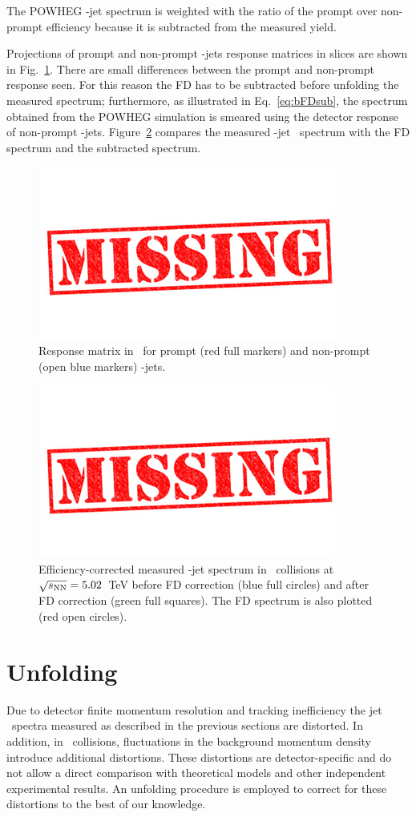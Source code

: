 The POWHEG \Dstar-jet spectrum is weighted with the ratio of the prompt over non-prompt efficiency because it is subtracted from the measured yield.

Projections of prompt and non-prompt \Dstar-jets response matrices in slices \ptchjetgen are shown in Fig.~\ref{fig:pPbres_prompt_nonprompt}. There are small differences between the prompt and non-prompt response seen. 
For this reason the FD has to be subtracted before unfolding the measured spectrum; furthermore, as illustrated in Eq.~\ref{eq:bFDsub}, the spectrum obtained
from the POWHEG simulation is smeared using the detector response of non-prompt \Dstar-jets. 
Figure~\ref{fig:pPbFD_corr} compares the measured \Dstar-jet \pt\ spectrum with the FD spectrum and the subtracted spectrum.

\begin{figure}[bth]
\centering
\includegraphics[width=.2\textwidth]{missing}
\caption{Response matrix in \ptchjetgen\ for prompt (red full markers) and non-prompt (open blue markers) \Dstar-jets.}
\label{fig:pPbres_prompt_nonprompt}
\end{figure}


\begin{figure}[bth]
\centering
\includegraphics[width=.2\textwidth]{missing}
\caption{Efficiency-corrected measured \Dstar-jet spectrum in \pPb\ collisions at $\sqrt{s_{\rm NN}}=5.02$~TeV before FD correction (blue full circles)
and after FD correction (green full squares). The FD spectrum is also plotted (red open circles).}
\label{fig:pPbFD_corr}
\end{figure}



\section{Unfolding}
\label{sect:unfResults}
Due to detector finite momentum resolution and tracking inefficiency the jet \pt\ spectra measured as described
in the previous sections are distorted. In addition, in \pPb\ collisions, fluctuations in the background momentum density
introduce additional distortions. These distortions are detector-specific and do not allow a direct comparison
with theoretical models and other independent experimental results.
An unfolding procedure is employed to correct for these distortions to the best of our knowledge.


